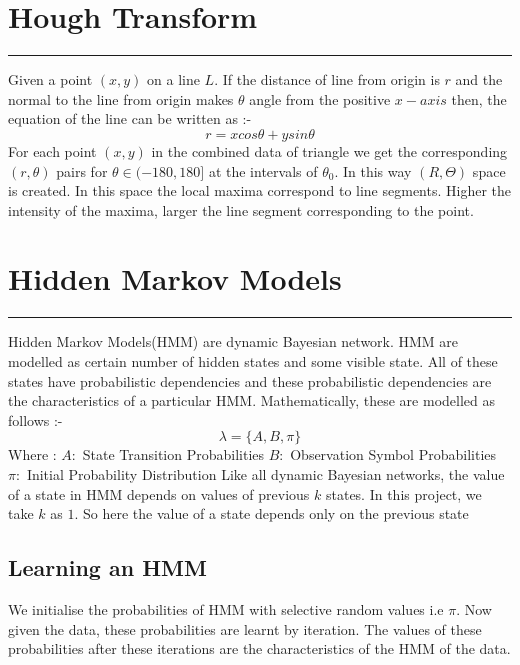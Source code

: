 \def\DevnagVersion{2.15}\documentclass[a4paper, 11pt, notitlepage]{report}
\begin{document}


\appendix
\chapter{Hough Transform}

\hrule height 2pt
\vspace*{10pt} 

\hspace*{10pt} Given a point $(x, y)$ on a line $L$. If the distance of line from origin is $r$ and the normal to the line from origin makes $\theta$ angle from the positive $x-axis$ then, the equation of the line can be written as :-\\
$$r = x cos\theta + y sin\theta$$
For each point $(x,y)$ in the combined data of triangle we get the corresponding $(r, \theta)$ pairs for $\theta \in (-180, 180]$ at the intervals of $\theta _ 0$. In this way $(R, \Theta)$ space is created. In this space the local maxima correspond to line segments. Higher the intensity of the maxima, larger the line segment corresponding to the point.\\

\chapter{Hidden Markov Models}

\hrule height 2pt
\vspace*{10pt} 

Hidden Markov Models(HMM) are dynamic Bayesian network. HMM are modelled as certain number of hidden states and some visible state. All of these states have probabilistic dependencies and these probabilistic dependencies are the characteristics of a particular HMM. Mathematically, these are modelled as follows :-\\
$$\lambda = \{A, B, \pi \}$$
Where : 
\hspace*{20pt} $A :$ State Transition Probabilities 
\hspace*{20pt} $B :$ Observation Symbol Probabilities
\hspace*{20pt} $\pi :$ Initial Probability Distribution
Like all dynamic Bayesian networks, the value of a state in HMM depends on values of  previous $k$ states. In this project, we take $k$ as $1$. So here the value of a state depends only on the previous state

\hspace*{10pt} \section{Learning an HMM }
We initialise the probabilities of HMM with selective random values i.e $\pi$. Now given the data, these probabilities are learnt by iteration. The values of these probabilities after these iterations are the characteristics of the HMM of the data.
\end{document}
